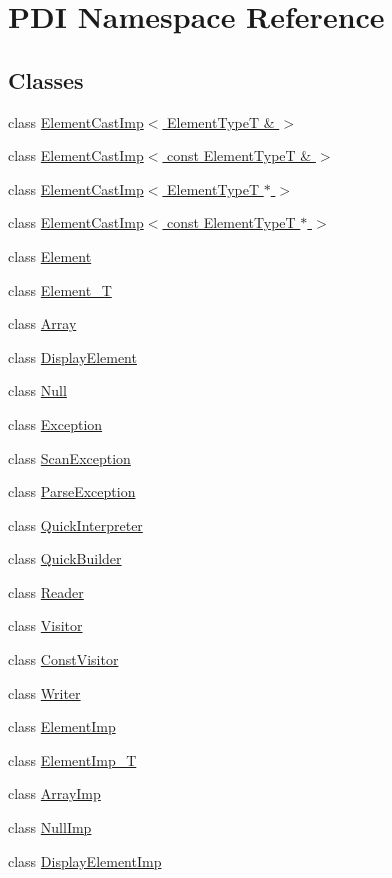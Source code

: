 \hypertarget{namespace_p_d_i}{
\section{PDI Namespace Reference}
\label{namespace_p_d_i}
}
\subsection*{Classes}
\begin{CompactItemize}
\item 
class \hyperlink{class_p_d_i_1_1_element_cast_imp_3_01_element_type_t_01_6_01_4}{ElementCastImp$<$ ElementTypeT \& $>$}
\item 
class \hyperlink{class_p_d_i_1_1_element_cast_imp_3_01const_01_element_type_t_01_6_01_4}{ElementCastImp$<$ const ElementTypeT \& $>$}
\item 
class \hyperlink{class_p_d_i_1_1_element_cast_imp_3_01_element_type_t_01_5_01_4}{ElementCastImp$<$ ElementTypeT $\ast$ $>$}
\item 
class \hyperlink{class_p_d_i_1_1_element_cast_imp_3_01const_01_element_type_t_01_5_01_4}{ElementCastImp$<$ const ElementTypeT $\ast$ $>$}
\item 
class \hyperlink{class_p_d_i_1_1_element}{Element}
\item 
class \hyperlink{class_p_d_i_1_1_element___t}{Element\_\-T}
\item 
class \hyperlink{class_p_d_i_1_1_array}{Array}
\item 
class \hyperlink{class_p_d_i_1_1_display_element}{DisplayElement}
\item 
class \hyperlink{class_p_d_i_1_1_null}{Null}
\item 
class \hyperlink{class_p_d_i_1_1_exception}{Exception}
\item 
class \hyperlink{class_p_d_i_1_1_scan_exception}{ScanException}
\item 
class \hyperlink{class_p_d_i_1_1_parse_exception}{ParseException}
\item 
class \hyperlink{class_p_d_i_1_1_quick_interpreter}{QuickInterpreter}
\item 
class \hyperlink{class_p_d_i_1_1_quick_builder}{QuickBuilder}
\item 
class \hyperlink{class_p_d_i_1_1_reader}{Reader}
\item 
class \hyperlink{class_p_d_i_1_1_visitor}{Visitor}
\item 
class \hyperlink{class_p_d_i_1_1_const_visitor}{ConstVisitor}
\item 
class \hyperlink{class_p_d_i_1_1_writer}{Writer}
\item 
class \hyperlink{class_p_d_i_1_1_element_imp}{ElementImp}
\item 
class \hyperlink{class_p_d_i_1_1_element_imp___t}{ElementImp\_\-T}
\item 
class \hyperlink{class_p_d_i_1_1_array_imp}{ArrayImp}
\item 
class \hyperlink{class_p_d_i_1_1_null_imp}{NullImp}
\item 
class \hyperlink{class_p_d_i_1_1_display_element_imp}{DisplayElementImp}
\end{CompactItemize}
